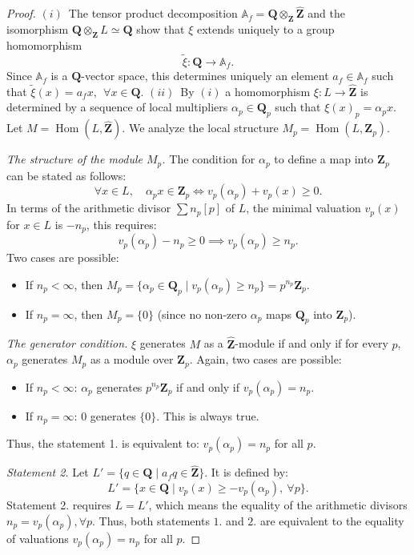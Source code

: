\documentclass[11pt,a4paper]{article}
\newcommand{\Q}{\mathbf{Q}}
\newcommand{\Z}{\mathbf{Z}}
\newcommand{\A}{\mathbb{A}}
\newcommand{\Zhat}{\widehat{\Z}}
\theoremstyle{plain}
\theoremstyle{definition} %
\begin{document}
\begin{proof}$(i)$~The tensor product decomposition $\A_f = \Q \otimes_{\Z} \Zhat$ and the isomorphism $\Q\otimes_{\Z} L\simeq \Q$ show that $\xi$ extends uniquely to a group homomorphism $$\tilde \xi:\Q\to \A_f.$$ Since $\A_f$ is a $\Q$-vector space, this determines uniquely an element $a_f\in \A_f$ such that $\tilde\xi(x)=a_f x, \ \ \forall x\in  \Q$.\newline
$(ii)$~By $(i)$ a homomorphism $\xi: L \to \widehat{\Z}$ is determined by a sequence of local multipliers $\alpha_p \in \Q_p$ such that $\xi(x)_p = \alpha_p x$.
Let $M = \operatorname{Hom}(L, \widehat{\Z})$. We analyze the local structure $M_p = \operatorname{Hom}(L, \Z_p)$.

\emph{The structure of the module $M_p$.}
The condition for $\alpha_p$ to define a map into $\Z_p$ can be stated as follows:
\[
\forall x \in L, \quad \alpha_p x \in \Z_p \iff v_p(\alpha_p) + v_p(x) \ge 0.
\]
In terms  of the arithmetic divisor $\sum n_p[p]$ of $L$, the minimal valuation $v_p(x)$ for $x\in L$ is $-n_p$, this requires:
\[
v_p(\alpha_p) - n_p \ge 0 \implies v_p(\alpha_p) \ge n_p.
\]
Two cases are possible:
\begin{itemize}[leftmargin=*, labelindent=0pt]
    \item[] If $n_p < \infty$, then $M_p = \{ \alpha_p \in \Q_p \mid v_p(\alpha_p) \ge n_p \} = p^{n_p} \Z_p$.
    \item[] If $n_p = \infty$, then $M_p = \{0\}$ (since no non-zero $\alpha_p$ maps $\Q_p$ into $\Z_p$).
\end{itemize}

\emph{The generator condition.}
$\xi$ generates $M$ as a $\widehat{\Z}$-module if and only if for every $p$, $\alpha_p$ generates $M_p$  as a module over $\Z_p$. Again, two cases are possible:
\begin{itemize}[leftmargin=*, labelindent=0pt]
    \item[] If $n_p < \infty$: $\alpha_p$ generates $p^{n_p} \Z_p$ if and only if $v_p(\alpha_p) = n_p$.
    \item[] If $n_p = \infty$: $0$ generates $\{0\}$. This is always true.
\end{itemize}
Thus, the statement 1. is equivalent to: $v_p(\alpha_p) = n_p$ for all $p$.\vspace{.04in}

\emph{Statement 2.}
Let $L'=\{q\in \Q\mid a_fq\in \widehat{\Z}\}$. It is  defined by:
\[
L' =   \{ x \in \Q \mid v_p(x) \ge -v_p(\alpha_p), \ \forall p \}.
\]
Statement 2. requires $L = L'$, which means the equality of the arithmetic divisors
$
 n_p = v_p(\alpha_p), \forall p
$.
Thus,  both statements $1$. and $2$. are equivalent to the equality of valuations $v_p(\alpha_p) = n_p$ for all  $p$.
\end{proof}
\end{document}
